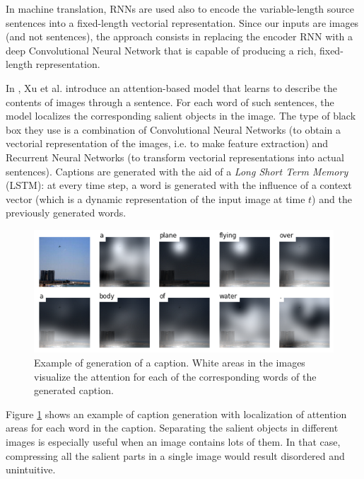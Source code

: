 \documentclass[12pt, twoside, a4paper]{report}
\begin{document}
In machine translation, RNNs are used also to encode the variable-length source sentences into a fixed-length vectorial representation. Since our inputs are images (and not sentences), the approach consists in replacing the encoder RNN with a deep Convolutional Neural Network that is capable of producing a rich, fixed-length representation.
\bigskip



In \cite{show_attend_and_tell}, Xu et al. introduce an attention-based model that learns to describe the contents of images through a sentence. For each word of such sentences, the model localizes the corresponding salient objects in the image. 
The type of black box they use is a combination of Convolutional Neural Networks (to obtain a vectorial representation of the images, i.e. to make feature extraction) and Recurrent Neural Networks (to transform vectorial representations into actual sentences).
Captions are generated with the aid of a \textit{Long Short Term Memory} (LSTM): at every time step, a word is generated with the influence of a context vector (which is a dynamic representation of the input image at time $t$) and the previously generated words.

\begin{figure}
\includegraphics[width=\linewidth]{images/paper-images/show-attend.png}
\caption{Example of generation of a caption. White areas in the images visualize the attention for each of the corresponding words of the generated caption\protect\footnotemark.}
\label{fig:show-attend}
\end{figure}


Figure \ref{fig:show-attend} shows an example of caption generation with localization of attention areas for each word in the caption. Separating the salient objects in different images is especially useful when an image contains lots of them. In that case, compressing all the salient parts in a single image would result disordered and unintuitive.
\end{document}
